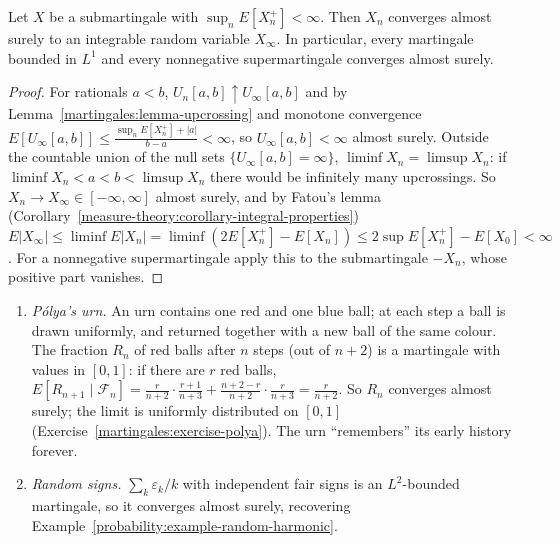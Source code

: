 \begin{theorem}\label{martingales:theorem-convergence}
Let $X$ be a submartingale with $\sup_nE[X_n^+] < \infty$. Then $X_n$ converges almost surely to an integrable random variable $X_\infty$. In particular, every martingale bounded in $L^1$ and every nonnegative
supermartingale converges almost surely.
\end{theorem}

\begin{proof}
For rationals $a < b$, $U_n[a, b] \uparrow U_\infty[a, b]$ and by Lemma~\ref{martingales:lemma-upcrossing} and monotone convergence $E[U_\infty[a, b]] \leq \frac{\sup_nE[X_n^+] + |a|}{b - a} < \infty$, so $U_\infty[a, b] < \infty$ almost
surely. Outside the countable union of the null sets $\{U_\infty[a, b] = \infty\}$, $\liminf X_n = \limsup X_n$: if $\liminf X_n < a < b < \limsup X_n$ there would be infinitely many upcrossings. So $X_n \to X_\infty \in [-\infty, \infty]$
almost surely, and by Fatou's lemma (Corollary~\ref{measure-theory:corollary-integral-properties}) $E|X_\infty| \leq \liminf E|X_n| = \liminf(2E[X_n^+] - E[X_n]) \leq 2\sup E[X_n^+] - E[X_0] < \infty$. For a nonnegative
supermartingale apply this to the submartingale $-X_n$, whose positive part vanishes.
\end{proof}

\begin{example}\label{martingales:example-convergence}
\begin{enumerate}
\item \emph{P\'olya's urn.} An urn contains one red and one blue ball; at each step a ball is drawn uniformly, and returned together with a new ball of the same colour. The fraction $R_n$ of red balls after $n$ steps (out
of $n + 2$) is a martingale with values in $[0, 1]$: if there are $r$ red balls, $E[R_{n+1} \mid \mathcal{F}_n] = \frac{r}{n+2}\cdot\frac{r + 1}{n + 3} + \frac{n + 2 - r}{n + 2}\cdot\frac{r}{n + 3} = \frac{r}{n + 2}$. So $R_n$ converges almost
surely; the limit is uniformly distributed on $[0, 1]$ (Exercise~\ref{martingales:exercise-polya}). The urn ``remembers'' its early history forever.
\item \emph{Random signs.} $\sum_k\varepsilon_k/k$ with independent fair signs is an $L^2$-bounded martingale, so it converges almost surely, recovering Example~\ref{probability:example-random-harmonic}.
\end{enumerate}
\end{example}

